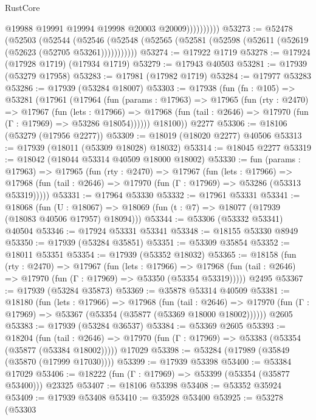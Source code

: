 \begin{lexlean}{RustCore}
\begin{coremodule}
                        @19988
                        @19991
                        @19994
                        @19998
                        @20003
                        @20009))))))))))
@53273 := @52478
    (@52503
      (@52544
        (@52546 (@52548 (@52565 (@52581 (@52598 (@52611 (@52619 (@52623 (@52705 @53261)))))))))))
@53274 := @17922 @1719
@53278 := @17924 (@17928 @1719) (@17934 @1719)
@53279 := @17943 @40503
@53281 := @17939 (@53279 @17958)
@53283 := @17981 (@17982 @1719)
@53284 := @17977 @53283
@53286 := @17939 (@53284 @18007)
@53303 := @17938
    (fun (fn : @105) =>
    @53281
      (@17961
        (@17964
          (fun (params : @17963) =>
          @17965
            (fun (rty : @2470) =>
            @17967
              (fun (lets : @17966) =>
              @17968 (fun (tail : @2646) => @17970 (fun (Γ : @17969) => @53286 @18054))))))
        @18100))
    @2277
@53306 := @18106 (@53279 (@17956 @2277))
@53309 := @18019 (@18020 @2277) @40506
@53313 := @17939 (@18011 (@53309 @18028) @18032)
@53314 := @18045 @2277
@53319 := @18042 (@18044 @53314 @40509 @18000 @18002)
@53330 := fun (params : @17963) =>
  @17965
    (fun (rty : @2470) =>
    @17967
      (fun (lets : @17966) =>
      @17968 (fun (tail : @2646) => @17970 (fun (Γ : @17969) => @53286 (@53313 @53319)))))
@53331 := @17964 @53330
@53332 := @17961 @53331
@53341 := @18068
    (fun (U : @18067) => @18069 (fun (t : @7) => @18077 (@17939 (@18083 @40506 @17957) @18094)))
@53344 := @53306 (@53332 @53341) @40504
@53346 := @17924 @53331 @53341
@53348 := @18155 @53330 @8949
@53350 := @17939 (@53284 @35851)
@53351 := @53309 @35854
@53352 := @18011 @53351
@53354 := @17939 (@53352 @18032)
@53365 := @18158
    (fun (rty : @2470) =>
    @17967
      (fun (lets : @17966) =>
      @17968 (fun (tail : @2646) => @17970 (fun (Γ : @17969) => @53350 (@53354 @53319)))))
    @2495
@53367 := @17939 (@53284 @35873)
@53369 := @35878 @53314 @40509
@53381 := @18180
    (fun (lets : @17966) =>
    @17968
      (fun (tail : @2646) =>
      @17970 (fun (Γ : @17969) => @53367 (@53354 (@35877 (@53369 @18000 @18002))))))
    @2605
@53383 := @17939 (@53284 @36537)
@53384 := @53369 @2605
@53393 := @18204
    (fun (tail : @2646) => @17970 (fun (Γ : @17969) => @53383 (@53354 (@35877 (@53384 @18002)))))
    @17029
@53398 := @53284 (@17989 (@35849 (@35870 (@17999 @17030))))
@53399 := @17939 @53398
@53400 := @53384 @17029
@53406 := @18222 (fun (Γ : @17969) => @53399 (@53354 (@35877 @53400))) @23325
@53407 := @18106 @53398
@53408 := @53352 @35924
@53409 := @17939 @53408
@53410 := @35928 @53400
@53925 := @53278
    (@53303

\end{coremodule}
\end{lexlean}
